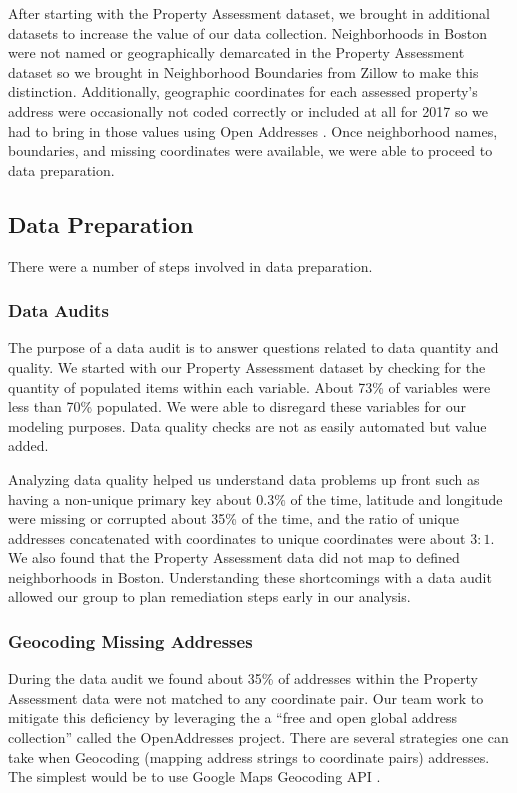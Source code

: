 \documentclass[12pt]{article}
\begin{document}
After starting with the Property Assessment dataset, we brought in
additional datasets to increase the value of our data collection.
Neighborhoods in Boston were not named or geographically demarcated in
the Property Assessment dataset so we brought in Neighborhood Boundaries
from Zillow \cite{ZillowNe81:online} to make this distinction.
Additionally, geographic coordinates for each assessed property's address
were occasionally not coded correctly or included at all for 2017 so we 
had to bring in those values using Open Addresses
\cite{OpenAddr24:online}. Once neighborhood names, boundaries, and missing
coordinates were available, we were able to proceed to data preparation.

\subsection{Data Preparation}

There were a number of steps involved in data preparation.

\subsubsection{Data Audits}

The purpose of a data audit is to answer questions related to data
quantity and quality. We started with our Property Assessment dataset
by checking for the quantity of populated items within each variable.
About 73\% of variables were less than 70\% populated. We were able to
disregard these variables for our modeling purposes. Data quality checks
are not as easily automated but value added.

Analyzing data quality helped us understand data problems up front
such as having a non-unique primary key about $0.3\%$ of the time,
latitude and longitude were missing or corrupted about 35\% of the time,
and the ratio of unique addresses concatenated with coordinates to
unique coordinates were about $3:1$. We also found that the Property
Assessment data did not map to defined neighborhoods in Boston.
Understanding these shortcomings with a data audit allowed our group
to plan remediation steps early in our analysis.


\subsubsection{Geocoding Missing Addresses}

During the data audit we found about 35\% of addresses within the
Property Assessment data were not matched to any coordinate pair. Our
team work to mitigate this deficiency by leveraging the
a ``free and open global address collection'' called the
OpenAddresses \cite{OpenAddr24:online} project. There are several
strategies one can take when Geocoding (mapping address strings to
coordinate pairs) addresses. The simplest would be to use Google Maps
Geocoding API \cite{GettingS89:online}.
\end{document}
